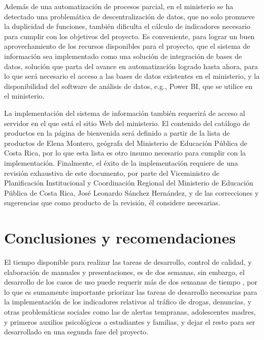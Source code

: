\documentclass{article}
\begin{document}
\begin{multicols}{6}[]
Adem\'as de una automatizaci\'on de procesos parcial, en el ministerio se ha detectado una problem\'atica de descentralizaci\'on de datos, que no solo promueve la duplicidad de funciones, tambi\'en dificulta el c\'alculo de indicadores necesario para cumplir con los objetivos del proyecto. Es conveniente, para lograr un buen aprovechamiento de los recursos disponibles para el proyecto, que el sistema de informaci\'on sea implementado como una soluci\'on de integraci\'on de bases de datos, soluci\'on que parta del avance en automatizaci\'on logrado hasta ahora, para lo que ser\'a necesario el acceso a las bases de datos existentes en el ministerio, y la disponibilidad del software de an\'alisis de datos, e.g., Power BI, que se utilice en el ministerio.

La implementaci\'on del sistema de informaci\'on tambi\'en requerir\'a de acceso al servidor en el que est\'a el sitio Web del ministerio. El contenido del cat\'alogo de productos en la p\'agina de bienvenida ser\'a definido a partir de la lista de productos de Elena Montero, ge\'ografa del Ministerio de Educaci\'on P\'ublica de Costa Rica, por lo que esta lista es otro insumo necesario para cumplir con la implementaci\'on. Finalmente, el \'exito de la implementaci\'on requiere de una revisi\'on exhaustiva de este documento, por parte del Viceministro de Planificaci\'on Institucional y Coordinaci\'on Regional del Ministerio de Educaci\'on P\'ublica de Costa Rica, Jos\'e Leonardo S\'anchez Hern\'andez, y de las correcciones y sugerencias que como producto de la revisi\'on, \'el considere necesarias. %

\section{Conclusiones y recomendaciones}

El tiempo disponible para realizar las tareas de desarrollo, control de calidad, y elaboraci\'on de manuales y presentaciones, es de dos semanas, sin embargo, el desarrollo de los casos de uso puede requerir m\'as de dos semanas de tiempo \cite{prop}, por lo que es sumamente importante priorizar las tareas de desarrollo necesarias para la implementaci\'on de los indicadores relativos al tr\'afico de drogas, denuncias, y otras problem\'aticas sociales como las de alertas tempranas, adolescentes madres, y primeros auxilios psicol\'ogicos a estudiantes y familias, y dejar el resto para ser desarrollado en una segunda fase del proyecto.


\end{multicols}
\end{document}

